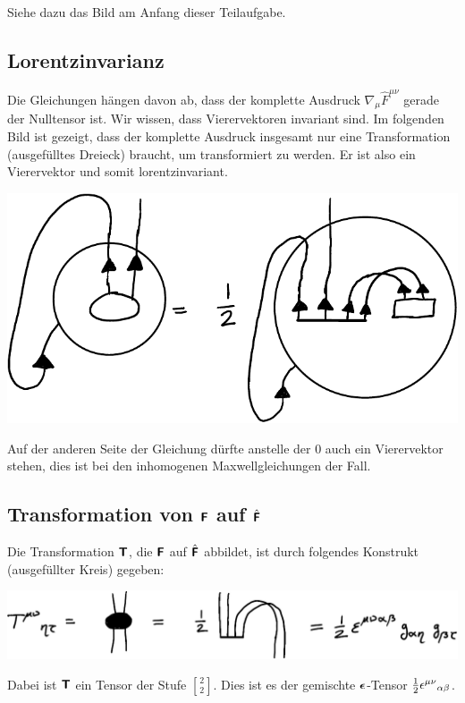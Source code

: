 Siehe dazu das Bild am Anfang dieser Teilaufgabe.

\subsection{Lorentzinvarianz}

Die Gleichungen hängen davon ab, dass der komplette Ausdruck $\nabla_\mu \hat
F^{\mu\nu}$ gerade der Nulltensor ist. Wir wissen, dass Vierervektoren
invariant sind. Im folgenden Bild ist gezeigt, dass der komplette Ausdruck
insgesamt nur eine Transformation (ausgefülltes Dreieck) braucht, um
transformiert zu werden. Er ist also ein Vierervektor und somit
lorentzinvariant.
\begin{center}
	\includegraphics{H1-Penrose-7-crop.pdf}
\end{center}

Auf der anderen Seite der Gleichung dürfte anstelle der 0 auch ein Vierervektor
stehen, dies ist bei den inhomogenen Maxwellgleichungen der Fall.

\subsection{Transformation von $\boldsymbol{\mathsf{F}}$ auf $\hat{\boldsymbol{\mathsf{F}}}$}

Die Transformation $\boldsymbol{\mathsf{T}}$, die $\boldsymbol{\mathsf{F}}$ auf $\hat{\boldsymbol{\mathsf{F}}}$ abbildet, ist
durch folgendes Konstrukt (ausgefüllter Kreis) gegeben:
\begin{center}
	\includegraphics{H1-Penrose-8-crop.pdf}
\end{center}

Dabei ist $\boldsymbol{\mathsf{T}}$ ein Tensor der Stufe ${2 \brack 2}$. Dies ist es der
gemischte $\boldsymbol{\mathsf{\epsilon}}$-Tensor $\frac 12 \epsilon^{\mu\nu}{}_{\alpha\beta}$.

